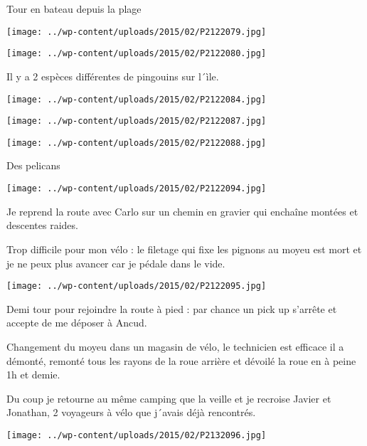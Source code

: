  Tour en bateau depuis la plage

 

\begin{center} \texttt{[image: ../wp-content/uploads/2015/02/P2122079.jpg]} \end{center}

 

\begin{center} \texttt{[image: ../wp-content/uploads/2015/02/P2122080.jpg]} \end{center}

 Il y a 2 espèces différentes de pingouins sur l´ìle. 

\begin{center} \texttt{[image: ../wp-content/uploads/2015/02/P2122084.jpg]} \end{center}

 

\begin{center} \texttt{[image: ../wp-content/uploads/2015/02/P2122087.jpg]} \end{center}

 

\begin{center} \texttt{[image: ../wp-content/uploads/2015/02/P2122088.jpg]} \end{center}

 Des pelicans 

\begin{center} \texttt{[image: ../wp-content/uploads/2015/02/P2122094.jpg]} \end{center}

 Je reprend la route avec Carlo sur un chemin en gravier qui enchaîne montées et descentes raides. 

 Trop difficile pour mon vélo : le filetage qui fixe les pignons au moyeu est mort et je ne peux plus avancer car je pédale dans le vide.

 

\begin{center} \texttt{[image: ../wp-content/uploads/2015/02/P2122095.jpg]} \end{center}

 Demi tour pour rejoindre la route à pied : par chance un pick up s'arrête et accepte de me déposer à Ancud.

 Changement du moyeu dans un magasin de vélo, le technicien est efficace il a démonté, remonté tous les rayons de la roue arrière et dévoilé la roue en à peine 1h et demie.

 Du coup je retourne au même camping que la veille et je recroise Javier et Jonathan, 2 voyageurs à vélo que j´avais déjà rencontrés.

 

\begin{center} \texttt{[image: ../wp-content/uploads/2015/02/P2132096.jpg]} \end{center}




 
 
